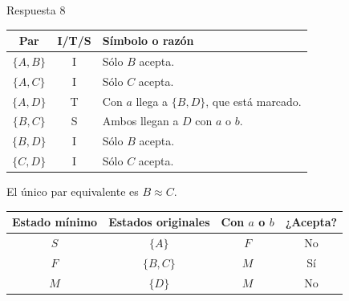 \documentclass[11pt,spanish]{article}
\begin{document}
\ifrespuestas
\begin{respuesta}{Respuesta 8}
\begin{center}
\small
\begin{tabular}{|c|c|p{}|}
\hline
\textbf{Par} & \textbf{I/T/S} & \textbf{Símbolo o razón} \tabularnewline
\hline
\(\{A,B\}\) & I & Sólo \(B\) acepta. \tabularnewline
\hline
\(\{A,C\}\) & I & Sólo \(C\) acepta. \tabularnewline
\hline
\(\{A,D\}\) & T & Con \(a\) llega a \(\{B,D\}\), que está marcado. \tabularnewline
\hline
\(\{B,C\}\) & S & Ambos llegan a \(D\) con \(a\) o \(b\). \tabularnewline
\hline
\(\{B,D\}\) & I & Sólo \(B\) acepta. \tabularnewline
\hline
\(\{C,D\}\) & I & Sólo \(C\) acepta. \tabularnewline
\hline
\end{tabular}
\end{center}

El único par equivalente es \(B\approx C\).

\begin{center}
\small
\begin{tabular}{|c|c|c|c|}
\hline
\textbf{Estado mínimo} & \textbf{Estados originales} & \textbf{Con \(a\) o \(b\)} & \textbf{¿Acepta?} \tabularnewline
\hline
\(S\) & \(\{A\}\) & \(F\) & No \tabularnewline
\hline
\(F\) & \(\{B,C\}\) & \(M\) & Sí \tabularnewline
\hline
\(M\) & \(\{D\}\) & \(M\) & No \tabularnewline
\hline
\end{tabular}
\end{center}
\end{respuesta}
\fi
\end{document}
